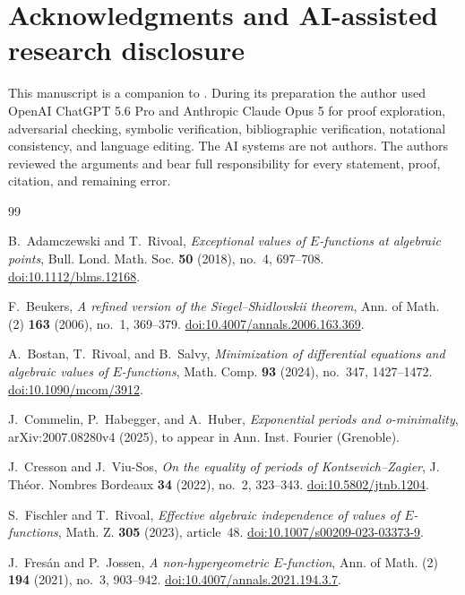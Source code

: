 \documentclass[11pt]{article}
\numberwithin{equation}{section}
\theoremstyle{definition}
\theoremstyle{remark}
\begin{document}
\section*{Acknowledgments and AI-assisted research disclosure}

This manuscript is a companion to \cite{LongEIT,LongLinearKZ}.  During its
preparation the author used OpenAI ChatGPT 5.6 Pro and Anthropic Claude Opus
5 for proof exploration, adversarial checking, symbolic verification,
bibliographic verification, notational consistency, and language editing.
The AI systems are not authors.  The authors reviewed the arguments and
bear full responsibility for every statement, proof, citation, and remaining
error.

\small
\begin{thebibliography}{99}

B.~Adamczewski and T.~Rivoal,
\emph{Exceptional values of $E$-functions at algebraic points},
Bull. Lond. Math. Soc. \textbf{50} (2018), no.~4, 697--708.
\href{https://doi.org/10.1112/blms.12168}{doi:10.1112/blms.12168}.

F.~Beukers,
\emph{A refined version of the Siegel--Shidlovskii theorem},
Ann. of Math. (2) \textbf{163} (2006), no.~1, 369--379.
\href{https://doi.org/10.4007/annals.2006.163.369}{doi:10.4007/annals.2006.163.369}.

A.~Bostan, T.~Rivoal, and B.~Salvy,
\emph{Minimization of differential equations and algebraic values of
$E$-functions},
Math. Comp. \textbf{93} (2024), no.~347, 1427--1472.
\href{https://doi.org/10.1090/mcom/3912}{doi:10.1090/mcom/3912}.

J.~Commelin, P.~Habegger, and A.~Huber,
\emph{Exponential periods and o-minimality},
arXiv:2007.08280v4 (2025), to appear in
Ann. Inst. Fourier (Grenoble).

J.~Cresson and J.~Viu-Sos,
\emph{On the equality of periods of Kontsevich--Zagier},
J. Th\'eor. Nombres Bordeaux \textbf{34} (2022), no.~2, 323--343.
\href{https://doi.org/10.5802/jtnb.1204}{doi:10.5802/jtnb.1204}.

S.~Fischler and T.~Rivoal,
\emph{Effective algebraic independence of values of $E$-functions},
Math. Z. \textbf{305} (2023), article~48.
\href{https://doi.org/10.1007/s00209-023-03373-9}{doi:10.1007/s00209-023-03373-9}.

J.~Fres\'an and P.~Jossen,
\emph{A non-hypergeometric $E$-function},
Ann. of Math. (2) \textbf{194} (2021), no.~3, 903--942.
\href{https://doi.org/10.4007/annals.2021.194.3.7}{doi:10.4007/annals.2021.194.3.7}.


\end{thebibliography}
\end{document}
